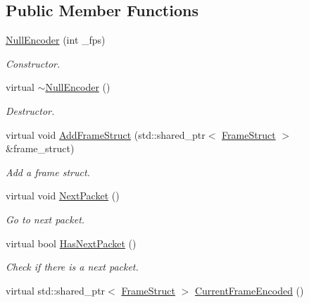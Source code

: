 \subsection*{Public Member Functions}
\begin{DoxyCompactItemize}
\item 
\hyperlink{classmoetsi_1_1ssp_1_1NullEncoder_aaae4b8ed8b56ae9526f04853b56d1650}{Null\+Encoder} (int \+\_\+fps)
\begin{DoxyCompactList}\small\item\em Constructor. \end{DoxyCompactList}\item 
\mbox{\label{classmoetsi_1_1ssp_1_1NullEncoder_a503705e0c63e88d583cf587de8d21b78}} 
virtual \hyperlink{classmoetsi_1_1ssp_1_1NullEncoder_a503705e0c63e88d583cf587de8d21b78}{$\sim$\+Null\+Encoder} ()
\begin{DoxyCompactList}\small\item\em Destructor. \end{DoxyCompactList}\item 
virtual void \hyperlink{classmoetsi_1_1ssp_1_1NullEncoder_a05f90c640c372d00f45173ec3e9436be}{Add\+Frame\+Struct} (std\+::shared\+\_\+ptr$<$ \hyperlink{structmoetsi_1_1ssp_1_1FrameStruct}{Frame\+Struct} $>$ \&frame\+\_\+struct)
\begin{DoxyCompactList}\small\item\em Add a frame struct. \end{DoxyCompactList}\item 
\mbox{\label{classmoetsi_1_1ssp_1_1NullEncoder_a5fe7215f2b462690208b2a144e962e14}} 
virtual void \hyperlink{classmoetsi_1_1ssp_1_1NullEncoder_a5fe7215f2b462690208b2a144e962e14}{Next\+Packet} ()
\begin{DoxyCompactList}\small\item\em Go to next packet. \end{DoxyCompactList}\item 
virtual bool \hyperlink{classmoetsi_1_1ssp_1_1NullEncoder_a359eb668c16a1ef7963214f7f6303af4}{Has\+Next\+Packet} ()
\begin{DoxyCompactList}\small\item\em Check if there is a next packet. \end{DoxyCompactList}\item 
virtual std\+::shared\+\_\+ptr$<$ \hyperlink{structmoetsi_1_1ssp_1_1FrameStruct}{Frame\+Struct} $>$ \hyperlink{classmoetsi_1_1ssp_1_1NullEncoder_ae48926f99c368849ee8822aed10ac1b5}{Current\+Frame\+Encoded} ()

\end{DoxyCompactItemize}
